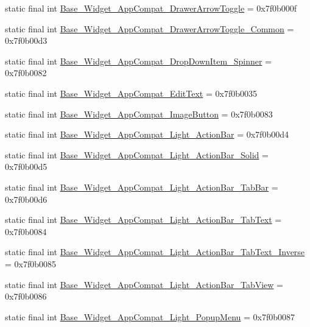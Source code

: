 \begin{CompactItemize}
static final int \hyperlink{classandroid_1_1support_1_1v7_1_1cardview_1_1_r_1_1style_2bb3e621b49191fa4ad9d7485fd62f08}{Base\_\-Widget\_\-AppCompat\_\-DrawerArrowToggle} = 0x7f0b000f
\item 
static final int \hyperlink{classandroid_1_1support_1_1v7_1_1cardview_1_1_r_1_1style_110ab9a779169af7fbf2292ce74006cb}{Base\_\-Widget\_\-AppCompat\_\-DrawerArrowToggle\_\-Common} = 0x7f0b00d3
\item 
static final int \hyperlink{classandroid_1_1support_1_1v7_1_1cardview_1_1_r_1_1style_d7750558f9ee7121df41b336f0c51bfb}{Base\_\-Widget\_\-AppCompat\_\-DropDownItem\_\-Spinner} = 0x7f0b0082
\item 
static final int \hyperlink{classandroid_1_1support_1_1v7_1_1cardview_1_1_r_1_1style_2ca6cfdaff55466a153e835a3ea616fa}{Base\_\-Widget\_\-AppCompat\_\-EditText} = 0x7f0b0035
\item 
static final int \hyperlink{classandroid_1_1support_1_1v7_1_1cardview_1_1_r_1_1style_1658eeddde6b93861f2b8b0fde01331e}{Base\_\-Widget\_\-AppCompat\_\-ImageButton} = 0x7f0b0083
\item 
static final int \hyperlink{classandroid_1_1support_1_1v7_1_1cardview_1_1_r_1_1style_31d808567db0e7617dcdfa5a14656c8e}{Base\_\-Widget\_\-AppCompat\_\-Light\_\-ActionBar} = 0x7f0b00d4
\item 
static final int \hyperlink{classandroid_1_1support_1_1v7_1_1cardview_1_1_r_1_1style_36c6a788f0beb393a4b1f80ea74c8dbe}{Base\_\-Widget\_\-AppCompat\_\-Light\_\-ActionBar\_\-Solid} = 0x7f0b00d5
\item 
static final int \hyperlink{classandroid_1_1support_1_1v7_1_1cardview_1_1_r_1_1style_8592da8b393025471f65ef815ce154a1}{Base\_\-Widget\_\-AppCompat\_\-Light\_\-ActionBar\_\-TabBar} = 0x7f0b00d6
\item 
static final int \hyperlink{classandroid_1_1support_1_1v7_1_1cardview_1_1_r_1_1style_41fa1c785695014e52e3698645c2c502}{Base\_\-Widget\_\-AppCompat\_\-Light\_\-ActionBar\_\-TabText} = 0x7f0b0084
\item 
static final int \hyperlink{classandroid_1_1support_1_1v7_1_1cardview_1_1_r_1_1style_5eb6e684d6a61b48efaebc5b5f792ec4}{Base\_\-Widget\_\-AppCompat\_\-Light\_\-ActionBar\_\-TabText\_\-Inverse} = 0x7f0b0085
\item 
static final int \hyperlink{classandroid_1_1support_1_1v7_1_1cardview_1_1_r_1_1style_82a6bf9e519e66aa9cbbe931b9f24ced}{Base\_\-Widget\_\-AppCompat\_\-Light\_\-ActionBar\_\-TabView} = 0x7f0b0086
\item 
static final int \hyperlink{classandroid_1_1support_1_1v7_1_1cardview_1_1_r_1_1style_549a750c3afaa806c342d7cef1df81de}{Base\_\-Widget\_\-AppCompat\_\-Light\_\-PopupMenu} = 0x7f0b0087

\end{CompactItemize}

